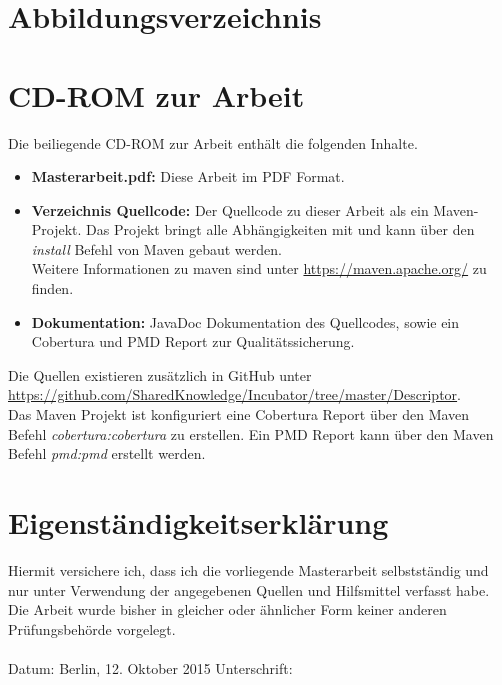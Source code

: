 \documentclass[a4paper]{article}
\begin{document}
	\printbibliography[type=article,heading=subbibliography,title={Artikel}]
	\printbibliography[type=book,heading=subbibliography,title={Bücher}]
	\printbibliography[type=manual,heading=subbibliography,title={Handbücher}]
	\printbibliography[type=misc,heading=subbibliography,title={Publikationen}] 			\printbibliography[type=report,heading=subbibliography,title={Spezifikationen}]
	\printbibliography[type=online,heading=subbibliography,title={Webseiten}]

	\newpage
	\section{Abbildungsverzeichnis}
	\makeatletter
	\makeatother
		
	\newpage	
	\begin{appendix}
	
	\section{CD-ROM zur Arbeit}
	\label{sec:CD}
	
	Die beiliegende CD-ROM zur Arbeit enthält die folgenden Inhalte.
	
	\begin{itemize}
		\item \textbf{Masterarbeit.pdf:} Diese Arbeit im PDF Format.
		\item \textbf{Verzeichnis Quellcode:} Der Quellcode zu dieser Arbeit
		als ein Maven-Projekt. Das Projekt bringt alle Abhängigkeiten mit
		und kann über den \emph{install} Befehl von Maven gebaut werden. \\
		Weitere Informationen zu maven sind unter \url{https://maven.apache.org/}
		zu finden.
		\item \textbf{Dokumentation:} JavaDoc Dokumentation des Quellcodes, sowie
		ein Cobertura und PMD Report zur Qualitätssicherung. 
	\end{itemize} 
	
	Die Quellen existieren zusätzlich in GitHub unter 
	\url{https://github.com/SharedKnowledge/Incubator/tree/master/Descriptor}. \\
	
	Das Maven Projekt ist konfiguriert eine Cobertura Report über den Maven Befehl 
	\emph{cobertura:cobertura} zu erstellen. Ein PMD Report kann über den Maven
	Befehl \emph{pmd:pmd} erstellt werden.
	

	\newpage	
  	\section{Eigenständigkeitserklärung}
  	Hiermit versichere ich, dass ich die vorliegende Masterarbeit selbstständig und
  	nur unter Verwendung der angegebenen Quellen und Hilfsmittel verfasst habe. Die
  	Arbeit wurde bisher in gleicher oder ähnlicher Form keiner anderen
  	Prüfungsbehörde vorgelegt. \\ \\
  	
 	Datum: \hspace{10pt} Berlin, 12. Oktober 2015 \hspace{30pt} Unterschrift:

	\end{appendix}
  	
\end{document}
